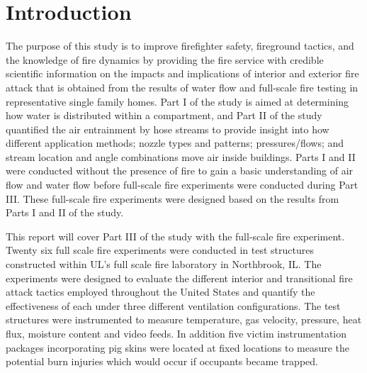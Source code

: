 \documentclass[12pt,oneside]{book}
\begin{document}


\newpage

\newpage

\chapter*{Introduction}

The purpose of this study is to improve firefighter safety, fireground tactics, and the knowledge of fire dynamics by providing the fire service with credible scientific information on the impacts and implications of interior and exterior fire attack that is obtained from the results of water flow and full-scale fire testing in representative single family homes. Part I of the study is aimed at determining how water is distributed within a compartment, and Part II of the study quantified the air entrainment by hose streams to provide insight into how different application methods; nozzle types and patterns; pressures/flows; and stream location and angle combinations move air inside buildings. Parts I and II were conducted without the presence of fire to gain a basic understanding of air flow and water flow before full-scale fire experiments were conducted during Part III. These full-scale fire experiments were designed based on the results from Parts I and II of the study. 

This report will cover Part III of the study with the full-scale fire experiment. Twenty six full scale fire experiments were conducted in test structures constructed within UL's full scale fire laboratory in Northbrook, IL. The experiments were designed to evaluate the different interior and transitional fire attack tactics employed throughout the United States and quantify the effectiveness of each under three different ventilation configurations. The test structures were instrumented to measure temperature, gas velocity, pressure, heat flux, moisture content and video feeds. In addition five victim instrumentation packages incorporating pig skins were located at fixed locations to measure the potential burn injuries which would occur if occupants became trapped. 
\end{document}
